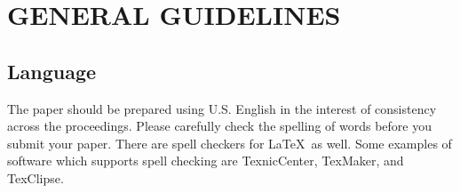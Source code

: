 \documentclass{wscpaperproc}
\theoremstyle{wsc}
\begin{document}
%

\section{GENERAL GUIDELINES}

\subsection{Language}

The paper should be prepared using U.S. English in the interest of consistency across the proceedings. Please carefully check the spelling of words before you submit your paper. There are spell checkers for \LaTeX\ as well.
Some examples of software which supports spell checking are TexnicCenter, TexMaker, and TexClipse.
\end{document}

